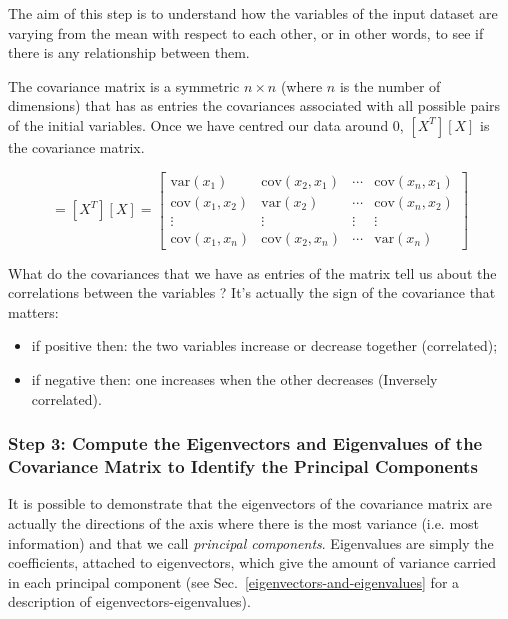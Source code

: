 \begin{enumerate}
The aim of this step is to understand how the variables of the input dataset are varying from the mean with respect to each other, or in other words, to see if there is any relationship between them. 

The covariance matrix is a symmetric $n\times n$ (where $n$ is the number of dimensions) that has as entries the covariances associated with all possible pairs of the initial variables. %
Once we have centred our data around 0, $[X^T][X]$ is the covariance matrix.

\begin{equation}
	[\Sigma]=[X^T][X] =
	\begin{bmatrix}
		\textrm{var}(x_1) & \textrm{cov}(x_2, x_1) & \cdots & \textrm{cov}(x_n, x_1) \\
		\textrm{cov}(x_1, x_2) & \textrm{var}(x_2) & \cdots & \textrm{cov}(x_n, x_2) \\
		\vdots & \vdots & \vdots & \vdots \\
		\textrm{cov}(x_1, x_n) & \textrm{cov}(x_2, x_n) & \cdots & \textrm{var}(x_n)
	\end{bmatrix}
\end{equation}

What do the covariances that we have as entries of the matrix tell us about the correlations between the variables ?
It’s actually the sign of the covariance that matters:
\begin{itemize}
	\item if positive then: the two variables increase or decrease together (correlated);
	\item if negative then: one increases when the other decreases (Inversely correlated).
\end{itemize}

\subsubsection*{Step 3: Compute the Eigenvectors and Eigenvalues of the Covariance Matrix to Identify the Principal Components}

It is possible to demonstrate that the eigenvectors of the covariance matrix are actually the directions of the axis where there is the most variance (i.e. most information) and that we call \emph{principal components}. Eigenvalues are simply the coefficients, attached to eigenvectors, which give the amount of variance carried in each principal component (see Sec.~\ref{eigenvectors-and-eigenvalues} for a description of eigenvectors-eigenvalues).


\end{enumerate}
